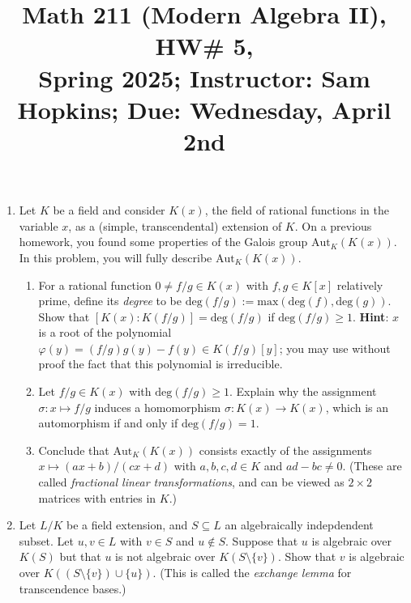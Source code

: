 \documentclass[11pt]{article}
\title{Math 211 (Modern Algebra II), HW\# 5, \\ {\normalsize Spring 2025; Instructor: Sam Hopkins; Due: Wednesday, April 2nd}}
\date{}
\begin{document}
\maketitle

\thispagestyle{empty}

\vspace{-1cm}

\begin{enumerate}

\item Let $K$ be a field and consider $K(x)$, the field of rational functions in the variable $x$, as a (simple, transcendental) extension of $K$. On a previous homework, you found some properties of the Galois group $\mathrm{Aut}_K(K(x))$. In this problem, you will fully describe $\mathrm{Aut}_K(K(x))$.
\begin{enumerate}
    \item For a rational function $0 \neq f/g \in K(x)$ with $f,g \in K[x]$ relatively prime, define its \emph{degree} to be $\mathrm{deg}(f/g) := \mathrm{max}(\mathrm{deg}(f),\mathrm{deg}(g))$. Show that $[K(x) : K(f/g)] = \mathrm{deg}(f/g)$ if $\mathrm{deg}(f/g) \geq 1$. {\bf Hint}: $x$ is a root of the polynomial $\varphi(y) = (f/g)g(y)-f(y) \in K(f/g)[y]$; you may use without proof the fact that this polynomial is irreducible.
    \item Let $f/g \in K(x)$ with $\mathrm{deg}(f/g) \geq 1$. Explain why the assignment $\sigma\colon x \mapsto f/g$ induces a homomorphism $\sigma \colon K(x) \to K(x)$, which is an automorphism if and only if $\mathrm{deg}(f/g)=1$.
    \item Conclude that $\mathrm{Aut}_K(K(x))$ consists exactly of the assignments $x \mapsto (ax+b)/(cx+d)$ with $a,b,c,d \in K$ and $ad - bc \neq 0$. (These are called \emph{fractional linear transformations}, and can be viewed as $2\times 2$ matrices with entries in $K$.)
\end{enumerate}

\item Let $L/K$ be a field extension, and $S \subseteq L$ an algebraically indepdendent subset. Let $u, v \in L$ with $v \in S$ and $u \notin S$. Suppose that $u$ is algebraic over $K(S)$ but that $u$ is not algebraic over $K(S \setminus \{v\})$. Show that $v$ is algebraic over $K((S \setminus \{v\}) \cup \{u\})$. (This is called the \emph{exchange lemma} for transcendence bases.)


\end{enumerate}
\end{document}
